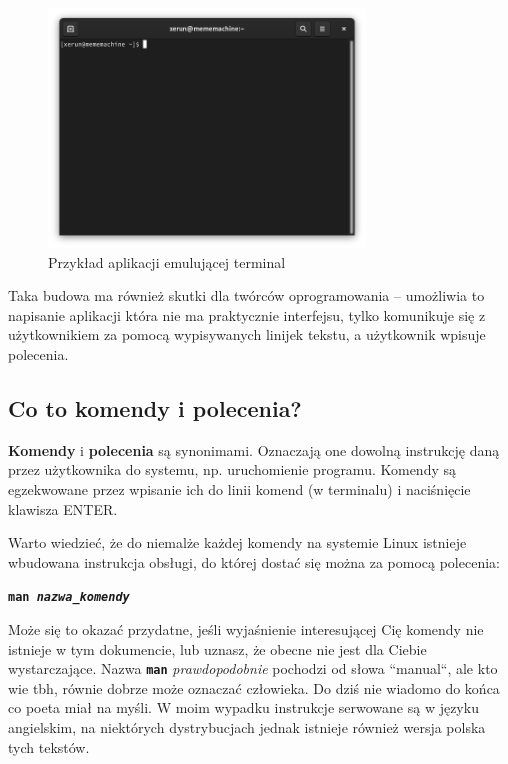 \documentclass[11pt, a4paper]{article}
\newcommand{\ttbf}[1]{
    \texttt{\textbf{#1}}
}
\begin{document}
\begin{figure}[H]
    \centering
    \includegraphics[width=0.75\textwidth]{przyklad terminal.png}
    \caption{Przykład aplikacji emulującej terminal}
\end{figure}

Taka budowa ma również skutki dla twórców oprogramowania -- umożliwia to napisanie aplikacji która nie ma praktycznie interfejsu, tylko komunikuje się z użytkownikiem za pomocą wypisywanych linijek tekstu, a użytkownik wpisuje polecenia. 

\subsection{Co to komendy i polecenia?}

\textbf{Komendy} i \textbf{polecenia} są synonimami. Oznaczają one dowolną instrukcję daną przez użytkownika do systemu, np. uruchomienie programu. Komendy są egzekwowane przez wpisanie ich do linii komend (w terminalu) i naciśnięcie klawisza ENTER.

Warto wiedzieć, że do niemalże każdej komendy na systemie Linux istnieje wbudowana instrukcja obsługi, do której dostać się można za pomocą polecenia:

\begin{tcolorbox}
    \ttbf{man \emph{nazwa\_komendy}}
\end{tcolorbox}

Może się to okazać przydatne, jeśli wyjaśnienie interesującej Cię komendy nie istnieje w tym dokumencie, lub uznasz, że obecne nie jest dla Ciebie wystarczające. Nazwa \ttbf{man} \emph{prawdopodobnie} pochodzi od słowa ``manual``, ale kto wie tbh, równie dobrze może oznaczać człowieka. Do dziś nie wiadomo do końca co poeta miał na myśli. W moim wypadku instrukcje serwowane są w języku angielskim, na niektórych dystrybucjach jednak istnieje również wersja polska tych tekstów.
\end{document}
